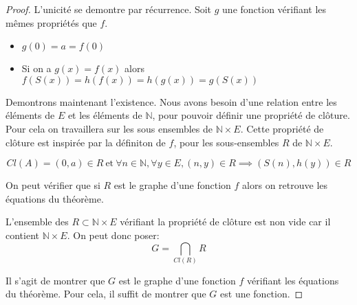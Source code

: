 \begin{proof}
	L'unicité se demontre par récurrence. Soit $g$ une fonction vérifiant les mêmes propriétés que $f$.
	\begin{itemize}
		\item $g(0) = a = f(0)$
		\item Si on a $g(x) = f(x)$ alors $f(S(x)) = h(f(x)) = h(g(x)) = g(S(x))$
	\end{itemize}
	Demontrons maintenant l'existence. Nous avons besoin d'une relation entre les éléments de $E$ et les éléments de $\mathbb{N}$, pour pouvoir
	définir une propriété de clôture. Pour cela on travaillera sur les sous ensembles de $\mathbb{N} \times E$.
	Cette propriété de clôture est inspirée par la définiton de $f$, pour les sous-ensembles $R$ de $\mathbb{N} \times E$.

	$$ Cl(A) = (0,a) \in R \ \text{et} \ \forall n \in \mathbb{N}, \forall y \in E, (n,y) \in R \implies (S(n), h(y)) \in R $$

	On peut vérifier que si $R$ est le graphe d'une fonction $f$ alors on retrouve les équations du théorème.

	L'ensemble des $R \subset \mathbb{N} \times E$ vérifiant la propriété de clôture est non vide car il contient $\mathbb{N} \times E$. On peut donc poser:
	$$ G = \bigcap\limits_{Cl(R)} R $$

	Il s'agit de montrer que $G$ est le graphe d'une fonction $f$ vérifiant les équations du théorème. Pour cela, il suffit de montrer que $G$ est une fonction.


\end{proof}
